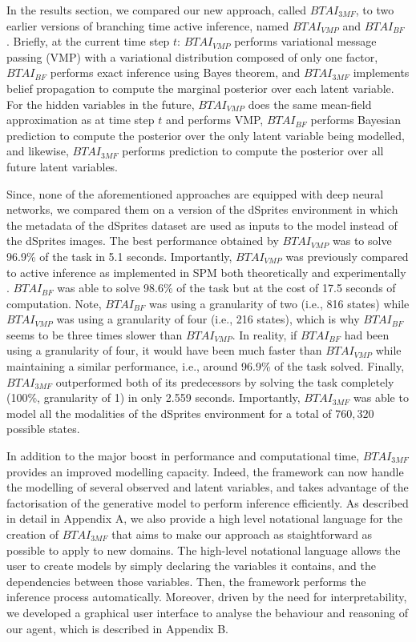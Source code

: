 \documentclass[twoside,11pt]{article}
\begin{document}
In the results section, we compared our new approach, called $BTAI_{3MF}$, to two earlier versions of branching time active inference, named $BTAI_{VMP}$ \citep{AITS_THEORY,AITS_PRACTICE} and $BTAI_{BF}$ \citep{BTAI_BF}. Briefly, at the current time step $t$: $BTAI_{VMP}$ performs variational message passing (VMP) with a variational distribution composed of only one factor, $BTAI_{BF}$ performs exact inference using Bayes theorem, and $BTAI_{3MF}$ implements belief propagation to compute the marginal posterior over each latent variable. For the hidden variables in the future, $BTAI_{VMP}$ does the same mean-field approximation as at time step $t$ and performs VMP, $BTAI_{BF}$ performs Bayesian prediction to compute the posterior over the only latent variable being modelled, and likewise, $BTAI_{3MF}$ performs prediction to compute the posterior over all future latent variables.

Since, none of the aforementioned approaches are equipped with deep neural networks, we compared them on a version of the dSprites environment in which the metadata of the dSprites dataset are used as inputs to the model instead of the dSprites images. The best performance obtained by $BTAI_{VMP}$ was to solve 96.9\% of the task in 5.1 seconds. Importantly, $BTAI_{VMP}$  was previously compared to active inference as implemented in SPM both theoretically and experimentally \citep{AITS_THEORY, AITS_PRACTICE}. $BTAI_{BF}$ was able to solve 98.6\% of the task but at the cost of 17.5 seconds of computation. Note, $BTAI_{BF}$ was using a granularity of two (i.e., 816 states) while $BTAI_{VMP}$ was using a granularity of four (i.e., 216 states), which is why $BTAI_{BF}$ seems to be three times slower than $BTAI_{VMP}$. In reality, if $BTAI_{BF}$ had been using a granularity of four, it would have been much faster than $BTAI_{VMP}$ while maintaining a similar performance, i.e., around 96.9\% of the task solved. Finally, $BTAI_{3MF}$ outperformed both of its predecessors by solving the task completely (100\%, granularity of 1) in only 2.559 seconds. Importantly, $BTAI_{3MF}$ was able to model all the modalities of the dSprites environment for a total of $760,320$ possible states.

In addition to the major boost in performance and computational time, $BTAI_{3MF}$ provides an improved modelling capacity. Indeed, the framework can now handle the modelling of several observed and latent variables, and takes advantage of the factorisation of the generative model to perform inference efficiently. As described in detail in Appendix A, we also provide a high level notational language for the creation of $BTAI_{3MF}$ that aims to make our approach as staightforward as possible to apply to new domains. The high-level notational language allows the user to create models by simply declaring the variables it contains, and the dependencies between those variables. Then, the framework performs the inference process automatically. Moreover, driven by the need for interpretability, we developed a graphical user interface to analyse the behaviour and reasoning of our agent, which is described in Appendix B.
\end{document}
